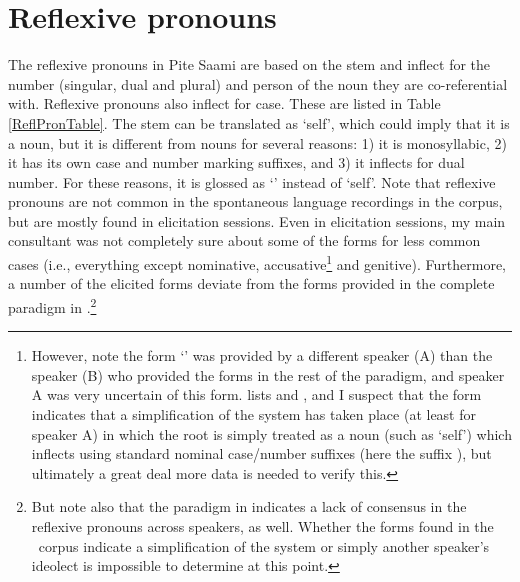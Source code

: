 
\FloatBarrier



\section{Reflexive pronouns}\label{reflexivePronouns}
The reflexive pronouns in Pite Saami are based on the stem  and inflect for the number (singular, dual and plural) and person of the noun they are co-referential with. Reflexive pronouns also inflect for case. These are listed in Table \vref{ReflPronTable}. 
The stem  can be translated as ‘self’, which could imply that it is a noun, but it is different from nouns for several reasons: 1) it is monosyllabic, 2) it has its own case and number marking suffixes, and 3) it inflects for dual number. For these reasons, it is glossed as ‘\REFLs’ instead of ‘self’. %
Note that reflexive pronouns are not common in the spontaneous language recordings in the corpus, but are mostly found in elicitation sessions. Even in elicitation sessions, my main consultant was not completely sure about some of the forms for less common cases (i.e., everything except nominative, accusative\footnote{However, note the form  ‘’ was provided by a different speaker (A) than the speaker (B) who provided the forms in the rest of the paradigm, and speaker A was very uncertain of this form. \citet[162]{Lehtiranta1992} lists  and , and I suspect that the form  indicates that a simplification of the system has taken place (at least for speaker A) in which the root  is simply treated as a noun (such as ‘self’) which inflects using standard nominal case/number suffixes (here the  suffix ), but ultimately a great deal more data is needed to verify this.} 
and genitive). Furthermore, a number of the elicited forms deviate from the forms provided in the complete paradigm in \citet[162]{Lehtiranta1992}.\footnote{But note also that the paradigm in \citet[162]{Lehtiranta1992} indicates a lack of consensus in the reflexive pronouns across speakers, as well. Whether the forms found in the \PSDP\ corpus indicate a simplification of the system or simply another speaker’s ideolect is impossible to determine at this point.}

